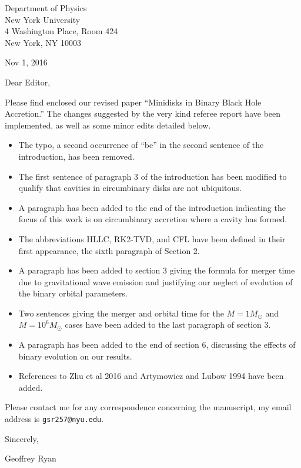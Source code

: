 \documentclass{letter}
\begin{document}
\begin{flushleft}
\begin{singlespace}
Department of Physics\\
New York University\\
4 Washington Place, Room 424\\
New York, NY 10003
\end{singlespace}

\vspace{0.5cm}

Nov 1, 2016

\vspace{0.5cm}

Dear Editor,


Please find enclosed our revised paper ``Minidisks in Binary Black Hole Accretion.'' The changes suggested by the very kind referee report have been implemented, as well as some minor edits detailed below.

\begin{itemize}
	\item The typo, a second occurrence of ``be'' in the second sentence of the introduction, has been removed. 
	\item The first sentence of paragraph 3 of the introduction has been modified to qualify that cavities in circumbinary disks are not ubiquitous.
	\item A paragraph has been added to the end of the introduction indicating the focus of this work is on circumbinary accretion where a cavity has formed.
	\item The abbreviations HLLC, RK2-TVD, and CFL have been defined in their first appearance, the sixth paragraph of Section 2.
	\item A paragraph has been added to section 3 giving the formula for merger time due to gravitational wave emission and justifying our neglect of evolution of the binary orbital parameters.
	\item Two sentences giving the merger and orbital time for the $M=1 M_{\odot}$  and $M=10^6 M_{\odot}$ cases have been added to the last paragraph of section 3.
	\item A paragraph has been added to the end of section 6, discussing the effects of binary evolution on our results.
	\item References to Zhu et al 2016 and Artymowicz and Lubow 1994 have been added.
\end{itemize}

  Please contact me for any correspondence concerning the manuscript, my email address is \texttt{gsr257@nyu.edu}.

\vspace{0.5cm}

Sincerely,

Geoffrey Ryan
\end{flushleft}
\end{document}
